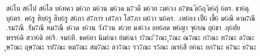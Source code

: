 {ส6ไบ
ส6ไป
ส6ไล
บ6ทคว
ม6วก
ม6วน
ม6วด
ม7วดี
ม6วย
ะม6วง
ล7ชน
ัต5ถุ
ัต6ถุ์
6ตร.
ธา6ตุ.
บุ6ตร.
ค6รู
ฮิบ6รู
ฮีบ6รู
ส6ภา
ส7ภาร
เส7ภา
โส7ภา
ผ6วา
น6คร.
.เห6ยง
เปี่6
เขี้6
ม6ณี
คาม7ณี
.รม7ณี
.รัม7ณี
หม7ณี
ง6วด
ง6วน
วัง7วน
ง6วย
มง6วง
อย6อด
พ6ญา
จุ6รณ
ฤ6ชา
.ฤ6ทัย
พรร6ดิ
สวา6ดิ
อ6ริ.
จน6ที.
ธค6ยา
นิม6นา
ย์ม6นา
า7ณะ
ิ7ณะ
ุ7ณะ
ณ7ณะ
ก7ณะ
ท7ณะ
ล7ณะ
ุษ7ณะ
ฤษ7ณะ
รป7ณะ
หม7ณะ
สม7ณะ
ลว7ณะ
รว7ณะ
ร5ณะ
ณร6สี
ก6นะ
ยก7นะ
ค7นะ
ย7นะ
}
